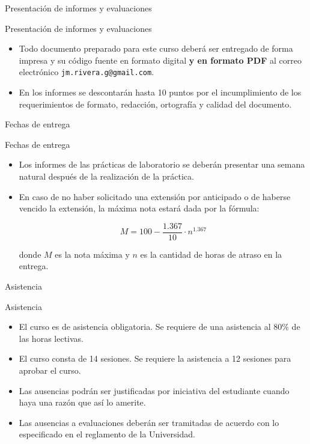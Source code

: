 \documentclass[handout,xcolor=dvipsnames]{beamer}
\begin{document}
\begin{frame}{Presentación de informes y evaluaciones}
\begin{block}{Presentación de informes y evaluaciones}
  \begin{itemize}[<+->]
    \item Todo documento preparado para este curso deberá ser entregado de forma impresa y su código fuente en formato digital \textbf{y en formato PDF} al correo electrónico \texttt{jm.rivera.g@gmail.com}.
    \item En los informes se descontarán hasta 10 puntos por el incumplimiento de los requerimientos de formato, redacción, ortografía y calidad del documento.
  \end{itemize}
\end{block}
\end{frame}

\begin{frame}{Fechas de entrega}
\begin{block}{Fechas de entrega}
  \begin{itemize}[<+->]
    \item Los informes de las prácticas de laboratorio se deberán presentar una semana natural después de la realización de la práctica.
    \item En caso de no haber solicitado una extensión por anticipado o de haberse vencido la extensión, la máxima nota estará dada por la fórmula:

      \[ M = 100-\frac{1.367}{10}\cdot n^{1.367} \]

    donde $M$ es la nota máxima y $n$ es la cantidad de horas de atraso en la entrega.
  \end{itemize}
\end{block}
\end{frame}

\begin{frame}{Asistencia}
\begin{block}{Asistencia}
  \begin{itemize}[<+->]
    \item El curso es de asistencia obligatoria. Se requiere de una asistencia al 80\% de las horas lectivas.
    \item El curso consta de 14 sesiones. Se requiere la asistencia a 12 sesiones para aprobar el curso.
    \item Las ausencias podrán ser justificadas por iniciativa del estudiante cuando haya una razón que así lo amerite.
    \item Las ausencias a evaluaciones deberán ser tramitadas de acuerdo con lo especificado en el reglamento de la Universidad.
  \end{itemize}
\end{block}
\end{frame}
\end{document}

